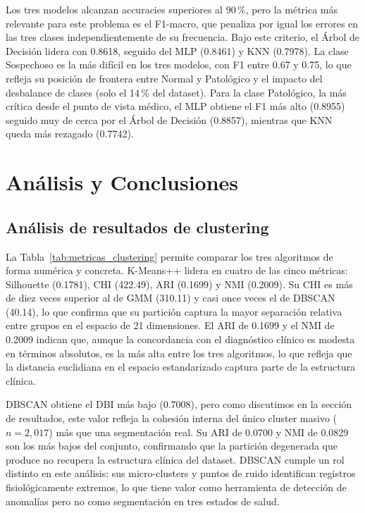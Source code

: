 \documentclass[12pt,letterpaper]{article}
\begin{document}
Los tres modelos alcanzan accuracies superiores al 90\,\%, pero la métrica más relevante
para este problema es el F1-macro, que penaliza por igual los errores en las tres clases
independientemente de su frecuencia. Bajo este criterio, el Árbol de Decisión lidera
con 0.8618, seguido del MLP (0.8461) y KNN (0.7978). La clase Sospechoso es la más
difícil en los tres modelos, con F1 entre 0.67 y 0.75, lo que refleja su posición de
frontera entre Normal y Patológico y el impacto del desbalance de clases (solo el 14\,\%
del dataset). Para la clase Patológico, la más crítica desde el punto de vista médico,
el MLP obtiene el F1 más alto (0.8955) seguido muy de cerca por el Árbol de Decisión
(0.8857), mientras que KNN queda más rezagado (0.7742).

\newpage

\section{Análisis y Conclusiones}
 
\subsection{Análisis de resultados de clustering}
 
La Tabla~\ref{tab:metricas_clustering} permite comparar los tres algoritmos de forma
numérica y concreta. K-Means++ lidera en cuatro de las cinco métricas: Silhouette
(0.1781), CHI (422.49), ARI (0.1699) y NMI (0.2009). Su CHI es más de diez veces
superior al de GMM (310.11) y casi once veces el de DBSCAN (40.14), lo que confirma
que su partición captura la mayor separación relativa entre grupos en el espacio de
21 dimensiones. El ARI de 0.1699 y el NMI de 0.2009 indican que, aunque la
concordancia con el diagnóstico clínico es modesta en términos absolutos, es la más
alta entre los tres algoritmos, lo que refleja que la distancia euclidiana en el
espacio estandarizado captura parte de la estructura clínica.
 
DBSCAN obtiene el DBI más bajo (0.7008), pero como discutimos en la sección de
resultados, este valor refleja la cohesión interna del único cluster masivo ($n=2{,}017$)
más que una segmentación real. Su ARI de 0.0700 y NMI de 0.0829 son los más bajos
del conjunto, confirmando que la partición degenerada que produce no recupera la
estructura clínica del dataset. DBSCAN cumple un rol distinto en este análisis: sus
micro-clusters y puntos de ruido identifican registros fisiológicamente extremos, lo
que tiene valor como herramienta de detección de anomalías pero no como segmentación
en tres estados de salud.
 
\end{document}
